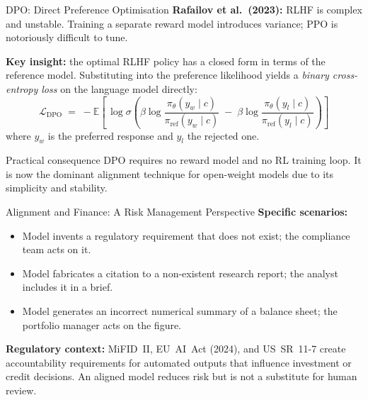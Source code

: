 \documentclass[11pt,aspectratio=169,professionalfonts]{beamer}
\begin{document}
\begin{frame}{DPO: Direct Preference Optimisation}
  \textbf{Rafailov et al.\ (2023):} RLHF is complex and unstable.
  Training a separate reward model introduces variance;
  PPO is notoriously difficult to tune.

  \medskip
  \textbf{Key insight:} the optimal RLHF policy has a closed form in terms
  of the reference model.  Substituting into the preference likelihood
  yields a \emph{binary cross-entropy loss} on the language model directly:
  \[
    \mathcal{L}_{\mathrm{DPO}}
    \;=\;
    -\mathbb{E}\!\left[\,\log\sigma\!\left(
      \beta\log\frac{\pi_\theta(y_w\mid c)}{\pi_{\mathrm{ref}}(y_w\mid c)}
      \;-\;
      \beta\log\frac{\pi_\theta(y_l\mid c)}{\pi_{\mathrm{ref}}(y_l\mid c)}
    \right)\right]
  \]
  where $y_w$ is the preferred response and $y_l$ the rejected one.

  \begin{block}{Practical consequence}
    DPO requires no reward model and no RL training loop.
    It is now the dominant alignment technique for open-weight models
    due to its simplicity and stability.
  \end{block}
\end{frame}
%
%
\begin{frame}{Alignment and Finance: A Risk Management Perspective}
  \textbf{Specific scenarios:}
  \begin{itemize}
    \item Model invents a regulatory requirement that does not exist;
          the compliance team acts on it.
    \item Model fabricates a citation to a non-existent research report;
          the analyst includes it in a brief.
    \item Model generates an incorrect numerical summary of a balance sheet;
          the portfolio manager acts on the figure.
  \end{itemize}
  \vspace{0.3em}
  \textbf{Regulatory context:}
  MiFID~II, EU~AI~Act (2024), and US~SR~11-7 create accountability
  requirements for automated outputs that influence investment or
  credit decisions.
  An aligned model reduces risk but is not a substitute for human review.
\end{frame}
\end{document}
